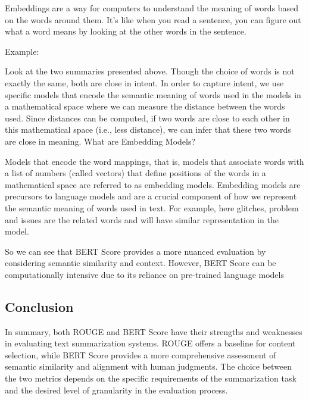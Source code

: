 Embeddings are a way for computers to understand the meaning of words based on the words around them. It's like when you read a sentence, you can figure out what a word means by looking at the other words in the sentence.

\noindent{}Example:
\begin{plainlist}
\item {}
\item {}
\end{plainlist}
Look at the two summaries presented above. Though the choice of words is not exactly the same, both are close in intent.
In order to capture intent, we use specific models that encode the semantic meaning of words used in the models in a mathematical space where we can measure the distance between the words used.
Since distances can be computed, if two words are close to each other in this mathematical space (i.e., less distance), we can infer that these two words are close in meaning.
What are Embedding Models?

Models that encode the word mappings, that is, models that associate words with a list of numbers (called vectors) that define positions of the words in a mathematical space are referred to as embedding models. 
Embedding models are precursors to language models and are a crucial component of how we represent the semantic meaning of words used in text. For example, here glitches, problem and issues are the related words and will have similar representation in the model. 


So we can see that BERT Score provides a more nuanced evaluation by considering semantic similarity and context. However, BERT Score can be computationally intensive due to its reliance on pre-trained language models

\subsection{Conclusion}
In summary, both ROUGE and BERT Score have their strengths and weaknesses in evaluating text summarization systems. ROUGE offers a baseline for content selection, while BERT Score provides a more comprehensive assessment of semantic similarity and alignment with human judgments. The choice between the two metrics depends on the specific requirements of the summarization task and the desired level of granularity in the evaluation process. 